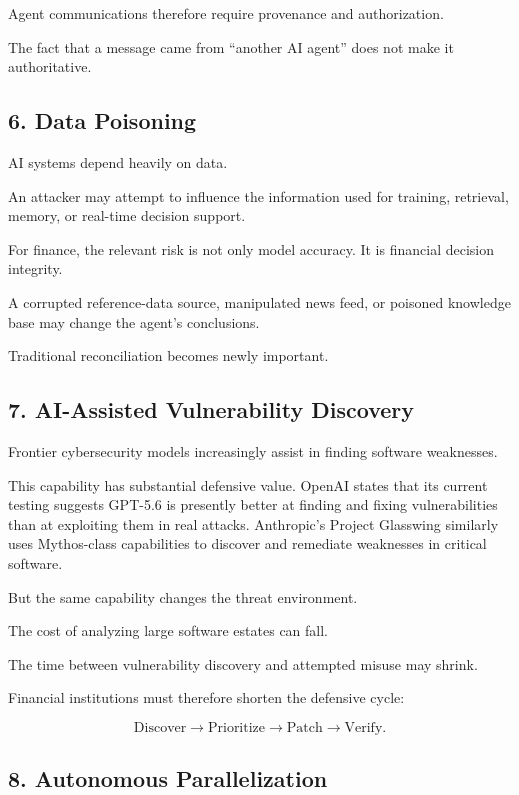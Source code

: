 Agent communications therefore require provenance and authorization.

The fact that a message came from ``another AI agent'' does not make it authoritative.

\subsection{6. Data Poisoning}

AI systems depend heavily on data.

An attacker may attempt to influence the information used for training, retrieval, memory, or real-time decision support.

For finance, the relevant risk is not only model accuracy. It is financial decision integrity.

A corrupted reference-data source, manipulated news feed, or poisoned knowledge base may change the agent's conclusions.

Traditional reconciliation becomes newly important.

\subsection{7. AI-Assisted Vulnerability Discovery}

Frontier cybersecurity models increasingly assist in finding software weaknesses.

This capability has substantial defensive value. OpenAI states that its current testing suggests GPT-5.6 is presently better at finding and fixing vulnerabilities than at exploiting them in real attacks. Anthropic's Project Glasswing similarly uses Mythos-class capabilities to discover and remediate weaknesses in critical software.

But the same capability changes the threat environment.

The cost of analyzing large software estates can fall.

The time between vulnerability discovery and attempted misuse may shrink.

Financial institutions must therefore shorten the defensive cycle:

\begin{equation}
\text{Discover}
\rightarrow
\text{Prioritize}
\rightarrow
\text{Patch}
\rightarrow
\text{Verify}.
\end{equation}

\subsection{8. Autonomous Parallelization}

